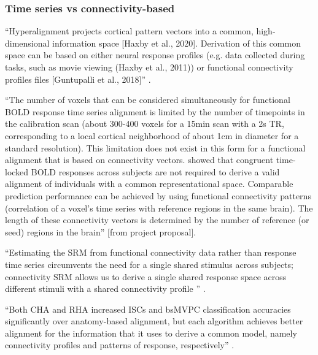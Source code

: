 \subsubsection{Time series vs connectivity-based}



``Hyperalignment projects cortical pattern vectors into a common,
high-dimensional information space [Haxby et al., 2020].
%
Derivation of this common space can be based on either neural response profiles
(e.g. data collected during tasks, such as movie viewing (Haxby et al., 2011))
or functional connectivity profiles files [Guntupalli et al., 2018]''
\citep{busch2021hybrid}.


``The number of voxels that can be considered simultaneously for functional BOLD
response time series alignment is limited by the number of timepoints in the
calibration scan (about 300-400 voxels for a 15min scan with a 2s TR,
corresponding to a local cortical neighborhood of about 1cm in diameter for a
standard resolution).
%
This limitation does not exist in this form for a functional alignment that is
based on connectivity vectors.
%
\citet{kaule2017examination} showed that congruent time-locked BOLD responses
across subjects are not required to derive a valid alignment of individuals with
a common representational space.
%
Comparable prediction performance can be achieved by using functional
connectivity patterns (correlation of a voxel's time series with reference
regions in the same brain).
%
The length of these connectivity vectors is determined by the number of
reference (or seed) regions in the brain'' [from project proposal].

``Estimating the SRM from functional connectivity data rather than
response time series circumvents the need for a single shared stimulus across
subjects; connectivity SRM allows us to derive a single shared response space
across different stimuli with a shared connectivity profile
\citep{nastase2019leveraging}'' \citep{kumar2020brainiak}.


``Both CHA and RHA increased ISCs and bsMVPC classification
accuracies significantly over anatomy-based alignment, but each algorithm
achieves better alignment for the information that it uses to derive a common
model, namely connectivity profiles and patterns of response, respectively''
\citep{guntupalli2018computational}.


